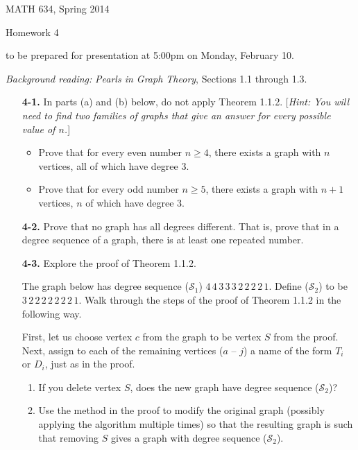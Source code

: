\documentclass[12pt]{article}
\begin{document}
\pagestyle{empty}

\begin{center}\large 
MATH 634, Spring 2014

{\sc Homework 4}

to be prepared for presentation at  5:00{\sc pm} on Monday, February 10.
\end{center}

\noindent
{\em Background reading:} {\em Pearls in Graph Theory}, Sections 1.1 through 1.3.


\begin{enumerate}
\item[\bf 4-1.] 
In parts (a) and (b) below, do not apply Theorem 1.1.2.  
[{\em Hint: You will need to find two families of graphs that give an answer for every possible value of $n$.}]
\begin{itemize}
\item Prove that for every even number $n\geq 4$, there exists a graph with $n$ vertices, all of which have degree $3$.
\item Prove that for every odd number $n\geq 5$, there exists a graph with $n+1$ vertices, $n$ of which have degree $3$.
\end{itemize}  


\item[\bf 4-2.]
Prove that no graph has all degrees different.  That is, prove that in a degree sequence of a graph, there is at least one repeated number.

\item[\bf 4-3.]
Explore the proof of Theorem 1.1.2.

The graph below has degree sequence ($\mathcal S_1$) $4\,4\, 3\, 3\, 3\, 2\, 2\, 2\, 2\, 1$.  Define ($\mathcal S_2$) to be $3\, 2\, 2\, 2\, 2\, 2\, 2\, 2\, 1$. Walk through the steps of the proof of Theorem 1.1.2 in the following way.

First, let us choose vertex $c$ from the graph to be vertex $S$ from the proof. Next, assign to each of the remaining vertices ($a$ -- $j$) a name of the form $T_i$ or $D_i$, just as in the proof.
\begin{enumerate}
\item If you delete vertex $S$, does the new graph have degree sequence ($\mathcal S_2$)?
\item Use the method in the proof to modify the original graph (possibly applying the algorithm multiple times) so that the resulting graph is such that removing $S$ gives a graph with degree sequence ($\mathcal S_2$).
\end{enumerate}


\end{enumerate}
\end{document}
